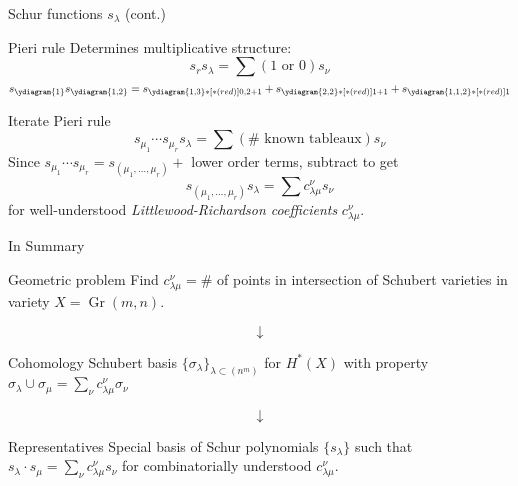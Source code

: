 \documentclass{beamer}
\DeclareMathOperator{\Gr}{Gr}
\newcommand{\cupprod}{\cup}
\begin{document}
\begin{frame}{Schur functions \(s_\lambda\) (cont.)}
  \begin{block}{Pieri rule}
    Determines multiplicative structure: \[
      s_r s_\lambda = \sum (1 \text{ or }0) s_\nu 
    \] \[
      s_{\ydiagram{1}} s_{\ydiagram{1,2}} =
      s_{\ydiagram{1,3}*[*(red)]{0,2+1}} +
      s_{\ydiagram{2,2}*[*(red)]{1+1}} + s_{\ydiagram{1,1,2}*[*(red)]{1}}
    \]
  \end{block}
  Iterate Pieri rule \[
    s_{\mu_1} \cdots s_{\mu_r} s_\lambda = \sum (\# \text{ known
      tableaux})s_\nu
  \]
  Since \(s_{\mu_1} \cdots s_{\mu_r} = s_{(\mu_1, \ldots, \mu_r)} +\)
  lower order terms, subtract to get \[
    s_{(\mu_1, \ldots, \mu_r)} s_\lambda = \sum c_{\lambda \mu}^\nu s_\nu
  \]
  for well-understood \emph{Littlewood-Richardson coefficients}
  \(c_{\lambda \mu}^\nu\). 
\end{frame}
\begin{frame}{In Summary}
    \begin{block}{Geometric problem}
    Find \(c_{\lambda \mu}^\nu = \#\) of points in
    intersection of Schubert varieties in variety \(X = \Gr(m,n)\). %
  \end{block}
  \vspace{-0.1in}
  \[
    \downarrow
  \]
  \vspace{-0.1in}
  \begin{block}{Cohomology}
    Schubert basis \(\{\sigma_\lambda\}_{\lambda \subset (n^m)}\) for \(H^*(X)\) with property \(\sigma_\lambda \cupprod \sigma_\mu = \sum_\nu c_{\lambda \mu}^\nu \sigma_\nu\) %
  \end{block}
\vspace{-0.1in}  
\[
  \downarrow
\]
\vspace{-0.1in}
\begin{block}{Representatives}
  Special basis of Schur polynomials \(\{s_\lambda\}\) such that
  \(s_\lambda \cdot s_\mu = \sum_\nu c_{\lambda \mu}^\nu s_\nu\) for
  combinatorially understood \(c_{\lambda \mu}^\nu\).
\end{block}

\end{frame}
\end{document}
